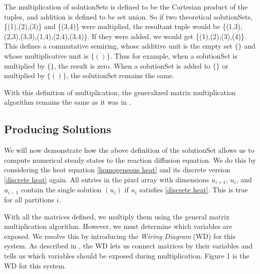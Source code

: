\documentclass[11pt]{article}
\begin{document}
The multiplication of solutionSets is defined to be the Cartesian product of the tuples, and addition is defined to be set union. So if two theoretical solutionSets, \{(1),(2),(3)\} and \{(3,4)\} were multiplied, the resultant tuple would be \{(1,3),(2,3),(3,3),(1,4),(2,4),(3,4)\}. If they were added, we would get \{(1),(2),(3),(4)\}. This defines a commutative semiring, whose additive unit is the empty set $\{\}$ and whose multiplicative unit is $\{()\}$. Thus for example, when a solutionSet is multiplied by $\{\}$, the result is zero. When a solutionSet is added to $\{\}$ or multiplied by $\{()\}$, the solutionSet remains the same.

With this definition of multiplication, the generalized matrix multiplication algorithm remains the same as it was in \citep{Introduction_to_PA}.

\subsection{Producing Solutions}

We will now demonstrate how the above definition of the solutionSet allows us to compute numerical steady states to the reaction diffusion equation. We do this by considering the heat equation \eqref{homogeneous heat} and its discrete version \eqref{discrete heat} again. All entries in the pixel array with dimensions $u_{i+1}$, $u_i$, and $u_{i-1}$ contain the single solution ${(u_i)}$ if $u_i$ satisfies \cref{discrete heat}. This is true for all partitions $i$.

With all the matrices defined, we multiply them using the general matrix multiplication algorithm. However, we must determine which variables are exposed. We resolve this by introducing the \textit{Wiring Diagram} (WD) for this system. As described in \citep{Introduction_to_PA}, the WD lets us connect matrices by their variables and tells us which variables should be exposed during multiplication. Figure 1 is the WD for this system.
\end{document}
